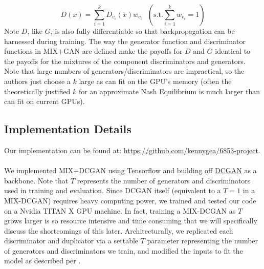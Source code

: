 \documentclass{article}
\begin{document}
\[
  D(x) = \sum\limits_{i = 1}^k D_{v_i}(x) w_{v_i} \mbox{  } (\mbox{s.t.} \sum\limits_{i=1}^k w_{v_i} = 1)
\]
Note $D$, like $G$, is also fully differentiable so that backpropagation can be harnessed during training. The way the generator function and discriminator functions in MIX+GAN are defined make the payoffs for $D$ and $G$ identical to the payoffs for the mixtures of the component discriminators and generators. Note that large numbers of generators/discriminators are impractical, so the authors just choose a $k$ large as can fit on the GPU's memory (often the theoretically justified $k$ for an approximate Nash Equilibrium is much larger than can fit on current GPUs).

\subsection{Implementation Details}
Our implementation can be found at: \url{https://github.com/kennygea/6853-project}.
\\\\
We implemented MIX+DCGAN using Tensorflow and building off \href{https://github.com/carpedm20/DCGAN-tensorflow}{DCGAN} as a backbone. Note that $T$ represents the number of generators and discriminators used in training and evaluation. Since DCGAN itself (equivalent to a $T=1$ in a MIX-DCGAN) requires heavy computing power, we trained and tested our code on a Nvidia TITAN X GPU machine. In fact, training a MIX-DCGAN as $T$ grows larger is so resource intensive and time consuming that we will specifically discuss the shortcomings of this later. Architecturally, we replicated each discriminator and duplicator via a settable $T$ parameter representing the number of generators and discriminators we train, and modified the inputs to fit the model as described per \citet{Arora17}. 
\end{document}
